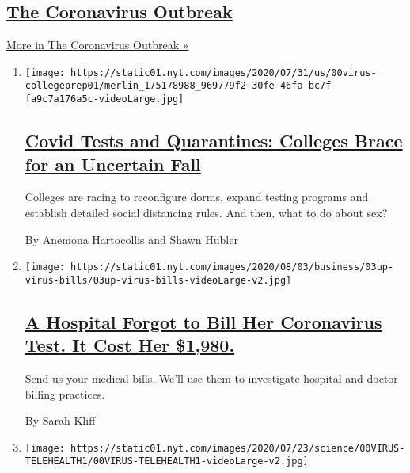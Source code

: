 \hypertarget{the-coronavirus-outbreak}{%
\subsection{\texorpdfstring{\href{/news-event/coronavirus}{The
Coronavirus
Outbreak}}{The Coronavirus Outbreak}}\label{the-coronavirus-outbreak}}

\href{/news-event/coronavirus}{More in The Coronavirus Outbreak »}

\begin{enumerate}
\def\labelenumi{\arabic{enumi}.}
\item
  \texttt{[image: https://static01.nyt.com/images/2020/07/31/us/00virus-collegeprep01/merlin\_175178988\_969779f2-30fe-46fa-bc7f-fa9c7a176a5c-videoLarge.jpg]}

  \hypertarget{covid-tests-and-quarantines-colleges-brace-for-an-uncertain-fall}{%
  \subsection{\texorpdfstring{\href{/2020/08/02/us/covid-college-reopening.html}{Covid
  Tests and Quarantines: Colleges Brace for an Uncertain
  Fall}}{Covid Tests and Quarantines: Colleges Brace for an Uncertain Fall}}\label{covid-tests-and-quarantines-colleges-brace-for-an-uncertain-fall}}

  Colleges are racing to reconfigure dorms, expand testing programs and
  establish detailed social distancing rules. And then, what to do about
  sex?

  By Anemona Hartocollis and Shawn Hubler
\item
  \texttt{[image: https://static01.nyt.com/images/2020/08/03/business/03up-virus-bills/03up-virus-bills-videoLarge-v2.jpg]}

  \hypertarget{a-hospital-forgot-to-bill-her-coronavirus-test-it-cost-her-1980}{%
  \subsection{\texorpdfstring{\href{/2020/08/03/upshot/nj-coronavirus-medical-bill.html}{A
  Hospital Forgot to Bill Her Coronavirus Test. It Cost Her
  \$1,980.}}{A Hospital Forgot to Bill Her Coronavirus Test. It Cost Her \$1,980.}}\label{a-hospital-forgot-to-bill-her-coronavirus-test-it-cost-her-1980}}

  Send us your medical bills. We'll use them to investigate hospital and
  doctor billing practices.

  By Sarah Kliff
\item
  \texttt{[image: https://static01.nyt.com/images/2020/07/23/science/00VIRUS-TELEHEALTH1/00VIRUS-TELEHEALTH1-videoLarge-v2.jpg]}


\end{enumerate}
